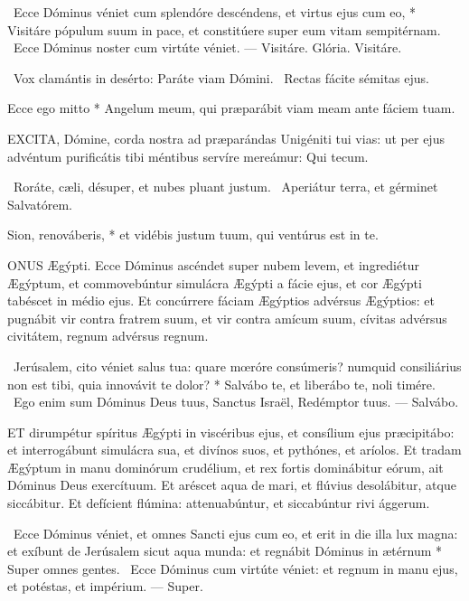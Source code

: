 \R\ Ecce Dóminus véniet cum splendóre descéndens, et virtus ejus cum eo, * Visitáre pópulum suum in pace, et constitúere super eum vitam sempitérnam. \V\ Ecce Dóminus noster cum virtúte véniet. --- Visitáre. Glória. Visitáre.

\V\ Vox clamántis in desérto: Paráte viam Dómini. \R\ Rectas fácite sémitas ejus.

 Ecce ego mitto * Angelum meum, qui præparábit viam meam ante fáciem tuam.


\lettrine[lines=2]{E}{XCITA}, Dómine, corda nostra ad præparándas Unigéniti tui vias: ut per ejus advéntum purificátis tibi méntibus servíre mereámur: Qui tecum.

\V\ Roráte, cæli, désuper, et nubes pluant justum. \R\ Aperiátur terra, et gérminet Salvatórem.

 Sion, renováberis, * et vidébis justum tuum, qui ventúrus est in te.




\lettrine[lines=2]{O}{NUS} Ægýpti. Ecce Dóminus ascéndet super nubem levem, et ingrediétur Ægýptum, et commovebúntur simulácra Ægýpti a fácie ejus, et cor Ægýpti tabéscet in médio ejus. Et concúrrere fáciam Ægýptios advérsus Ægýptios: et pugnábit vir contra fratrem suum, et vir contra amícum suum, cívitas advérsus civitátem, regnum advérsus regnum.

\R\ Jerúsalem, cito véniet salus tua: quare mœróre consúmeris? numquid consiliárius non est tibi, quia innovávit te dolor? * Salvábo te, et liberábo te, noli timére. \V\ Ego enim sum Dóminus Deus tuus, Sanctus Israël, Redémptor tuus. --- Salvábo.


\lettrine[lines=2]{E}{T} dirumpétur spíritus Ægýpti in viscéribus ejus, et consílium ejus præcipitábo: et interrogábunt simulácra sua, et divínos suos, et pythónes, et aríolos. Et tradam Ægýptum in manu dominórum crudélium, et rex fortis dominábitur eórum, ait Dóminus Deus exercítuum. Et aréscet aqua de mari, et flúvius desolábitur, atque siccábitur. Et defícient flúmina: attenuabúntur, et siccabúntur rivi ággerum.

\R\ Ecce Dóminus véniet, et omnes Sancti ejus cum eo, et erit in die illa lux magna: et exíbunt de Jerúsalem sicut aqua munda: et regnábit Dóminus in ætérnum * Super omnes gentes. \V\ Ecce Dóminus cum virtúte véniet: et regnum in manu ejus, et potéstas, et impérium. --- Super.

